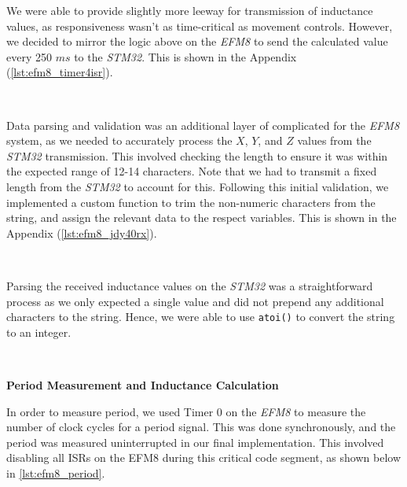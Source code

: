 \documentclass{article}
\begin{document}
We were able to provide slightly more leeway for transmission of inductance values, as responsiveness wasn't as time-critical as movement controls. However, we
decided to mirror the logic above on the \textit{EFM8} to send the calculated value every 250 $ms$ to the \textit{STM32}. This is shown in the Appendix (\ref{lst:efm8_timer4isr}).

\

Data parsing and validation was an additional layer of complicated for the \textit{EFM8} system, as we needed to accurately process the $X$, $Y$, and $Z$ values from
the \textit{STM32} transmission. This involved checking the length to ensure it was within the expected range of 12-14 characters. Note that we had to transmit a fixed length from the
\textit{STM32} to account for this. Following this initial validation, we implemented a custom function to trim the non-numeric characters from the string, and assign the relevant data
to the respect variables. This is shown in the Appendix (\ref{lst:efm8_jdy40rx}).

\

Parsing the received inductance values on the \textit{STM32} was a straightforward process as we only expected a single value and did not prepend any additional characters to the string.
Hence, we were able to use \texttt{atoi()} to convert the string to an integer.

\

\textbf{Period Measurement and Inductance Calculation}

In order to measure period, we used Timer 0 on the \textit{EFM8} to measure the number of clock cycles for a period signal.
This was done synchronously, and the period was measured uninterrupted in our final implementation. This involved disabling all ISRs on the EFM8
during this critical code segment, as shown below in \ref{lst:efm8_period}.
\end{document}
